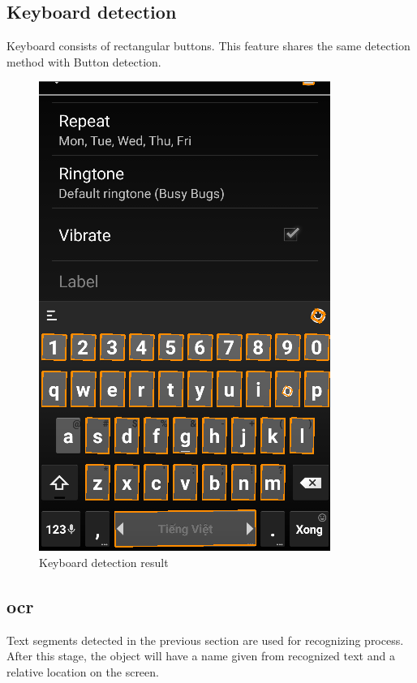 \subsection{Keyboard detection}
Keyboard consists of rectangular buttons. This feature shares the same detection method with Button detection.

	\begin{figure}[H]
		\centering
		\includegraphics[scale=0.5]{Chapters/Fig/kb_detect.png}
		\caption{Keyboard detection result}
		\label{fig:kb_detect}
	\end{figure}

\subsection{\acrlong{ocr}}
Text segments detected in the previous section are used for recognizing process. After this stage, the object will have a name given from recognized text and a relative location on the screen.

